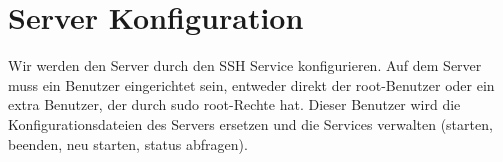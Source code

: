 \section{Server Konfiguration}

Wir werden den Server durch den SSH Service konfigurieren. Auf dem Server muss
ein Benutzer eingerichtet sein, entweder direkt der root-Benutzer oder ein extra
Benutzer, der durch sudo root-Rechte hat. Dieser Benutzer wird die
Konfigurationsdateien des Servers ersetzen und die Services verwalten (starten,
beenden, neu starten, status abfragen).



